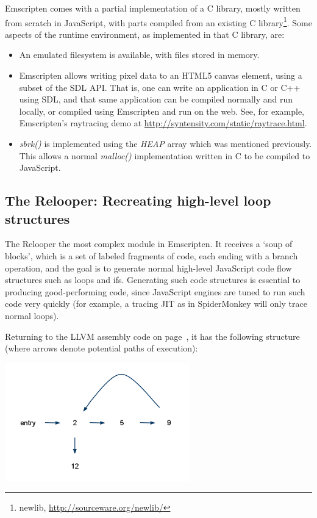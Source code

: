 \documentclass[preprint,10pt]{sigplanconf}
\begin{document}
Emscripten comes with a partial implementation of a C library,
mostly written from scratch in JavaScript, with parts compiled from an
existing C library\footnote{newlib, \url{http://sourceware.org/newlib/}}. Some aspects of the runtime environment, as
implemented in that C library, are:
\begin{itemize}
\item An emulated filesystem is available, with files stored in memory.
\item Emscripten allows writing pixel data to an HTML5 canvas element,
      using a subset of the SDL API. That is, one can write an application in C or C++ using
      SDL, and that same application can be compiled normally and run
      locally, or compiled using Emscripten and run on the web. See, for
      example, Emscripten's raytracing demo at \url{http://syntensity.com/static/raytrace.html}.
\item \emph{sbrk()} is implemented using the \emph{HEAP} array which
      was mentioned previously. This allows a normal \emph{malloc()}
      implementation written in C to be compiled to JavaScript.
\end{itemize}

\subsection{The Relooper: Recreating high-level loop structures}
\label{sec:relooper}

The Relooper the most complex module in Emscripten. It receives
a `soup of blocks', which is a set of labeled fragments of code, each
ending with a branch operation, and the goal is to generate normal
high-level JavaScript code flow structures such as loops and ifs.
Generating such code structures is essential to producing good-performing code,
since JavaScript engines are tuned to run such code very quickly (for
example, a tracing JIT as in SpiderMonkey will only trace normal loops).

Returning to the LLVM assembly code on page~\pageref{code:examplellvm}, it
has the following structure (where arrows denote potential paths of execution):

\includegraphics[width=80mm]{graph.png}
\end{document}

